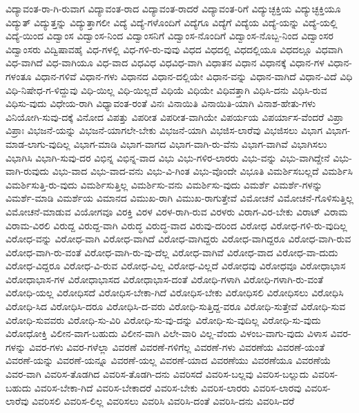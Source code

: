 {ವಿದ್ಯಾವಂತ-ರಾ-ಗಿ-ರುವಾಗ
ವಿದ್ಯಾವಂತ-ರಾದ
ವಿದ್ಯಾವಂತ-ರಾದರೆ
ವಿದ್ಯಾವಂತ-ರಿಗೆ
ವಿದ್ಯುಚ್ಛಕ್ತಿಯ
ವಿದ್ಯುಚ್ಛಕ್ತಿಯೂ
ವಿದ್ಯುತ್
ವಿದ್ಯುತ್ತನ್ನು
ವಿದ್ಯುತ್ತಾಗಲೀ
ವಿದ್ಯೆ
ವಿದ್ಯೆ-ಗಳೊಂದಿಗೆ
ವಿದ್ಯೆಗೂ
ವಿದ್ಯೆಗೆ
ವಿದ್ಯೆಯ
ವಿದ್ಯೆ-ಯನ್ನು
ವಿದ್ಯೆ-ಯಲ್ಲಿ
ವಿದ್ಯೆ-ಯಿಂದ
ವಿದ್ವಾಂಸ
ವಿದ್ವಾಂಸ-ನಿಂದ
ವಿದ್ವಾಂಸನಿಗೆ
ವಿದ್ವಾಂಸ-ನೊಂದಿಗೆ
ವಿದ್ವಾಂಸ-ನೊಬ್ಬ-ನಿಂದ
ವಿದ್ವಾಂಸರ
ವಿದ್ವಾಂಸರು
ವಿದ್ವಿಷಾವಹೈ
ವಿಧ-ಗಳಲ್ಲಿ
ವಿಧ-ಗಳಿ-ರು-ವುವು
ವಿಧದ
ವಿಧದಲ್ಲಿ
ವಿಧದಲ್ಲಿಯೂ
ವಿಧದಲ್ಲೂ
ವಿಧವಾಗಿ
ವಿಧ-ವಾಗಿದೆ
ವಿಧ-ವಾಗಿಯೂ
ವಿಧ-ವಾದ
ವಿಧವಿಧ
ವಿಧವಿಧ-ವಾಗಿ
ವಿಧಾತನ
ವಿಧಾನ
ವಿಧಾನಕ್ಕೆ
ವಿಧಾನ-ಗಳ
ವಿಧಾನ-ಗಳಂತೂ
ವಿಧಾನ-ಗಳಿವೆ
ವಿಧಾನ-ಗಳು
ವಿಧಾನದ
ವಿಧಾನ-ದಲ್ಲಿಯೇ
ವಿಧಾನ-ವನ್ನು
ವಿಧಾನ-ವಾಗಿದೆ
ವಿಧಾನ-ವಿದೆ
ವಿಧಿ
ವಿಧಿ-ನಿಷೇಧ-ಗ-ಳಿದ್ದುವು
ವಿಧಿ-ಯಿಲ್ಲ
ವಿಧಿ-ಯಿಲ್ಲದೆ
ವಿಧಿಯೆ
ವಿಧಿಯೇ
ವಿಧಿವತ್ತಾಗಿ
ವಿಧಿಸಿ-ದನು
ವಿಧಿಸಿ-ರುವ
ವಿಧಿಸು-ವುದು
ವಿಧೇಯ-ರಾಗಿ
ವಿಧ್ಯಾವಂತ-ರಂತೆ
ವಿನಃ
ವಿನಾಯಿತಿ
ವಿನಾಯಿತಿ-ಯಾಗಿ
ವಿನಾಶ-ಹೇತು-ಗಳು
ವಿನಿಯೋಗಿ-ಸುವು-ದಕ್ಕೆ
ವಿನೋದ
ವಿಪತ್ತು
ವಿಪರೀತ
ವಿಪರೀತ-ವಾಗಿಯೇ
ವಿಪರ್ಯಯ
ವಿಪರ್ಯಾಸ-ವೆಂದರೆ
ವಿಪ್ರಾ
ವಿಪ್ರಾಃ
ವಿಭಜನೆ-ಯನ್ನು
ವಿಭಜನೆ-ಯಾಗಲೇ-ಬೇಕು
ವಿಭಜನೆ-ಯಾಗಿ
ವಿಭಜಿಸ-ಲಾರೆವು
ವಿಭಜಿಸಲು
ವಿಭಾಗ
ವಿಭಾಗ-ಮಾಡ-ಲಾಗು-ವುದಿಲ್ಲ
ವಿಭಾಗ-ಮಾಡಿ
ವಿಭಾಗ-ವಾಗದ
ವಿಭಾಗ-ವಾಗಿ-ರು-ವೆನು
ವಿಭಾಗ-ವಾಗಿವೆ
ವಿಭಾಗಿಸಲು
ವಿಭಾಗಿಸಿ
ವಿಭಾಗಿ-ಸುವು-ದರ
ವಿಭಿನ್ನ
ವಿಭಿನ್ನ-ವಾದ
ವಿಭು
ವಿಭು-ಗಳಿರ-ಲಾರರು
ವಿಭು-ವನ್ನು
ವಿಭು-ವಾಗಿದ್ದೇನೆ
ವಿಭು-ವಾಗಿ-ರುವುದು
ವಿಭು-ವಾದ
ವಿಭು-ವಾದ-ವನು
ವಿಭು-ವಿ-ಗಿಂತ
ವಿಭು-ವೊಂದೇ
ವಿಭೂತಿ
ವಿಮರ್ಶಿಸಬಲ್ಲದೆ
ವಿಮರ್ಶಿಸಿ
ವಿಮರ್ಶಿಸುತ್ತಿ-ರು-ವುದು
ವಿಮರ್ಶಿಸುತ್ತಿಲ್ಲ
ವಿಮರ್ಶಿಸು-ವನು
ವಿಮರ್ಶಿಸು-ವುದು
ವಿಮರ್ಶೆ
ವಿಮರ್ಶೆ-ಗಳನ್ನು
ವಿಮರ್ಶೆ-ಮಾಡಿ
ವಿಮರ್ಶೆಯ
ವಿಮಾನದ
ವಿಮುಖ-ರಾಗಿ
ವಿಮುಖ-ರಾಗುತ್ತೇವೆ
ವಿಮೋಚನೆ
ವಿಮೋಚನೆ-ಗೊಳಿಸುತ್ತಿಲ್ಲ
ವಿಮೋಚನೆ-ಮಾಡುವ
ವಿಯೋಗವೂ
ವಿರಕ್ತಿ
ವಿರಳ
ವಿರಳ-ರಾಗಿ-ರುವ
ವಿರಳರು
ವಿರಾಗ-ವಿರ-ಬೇಕು
ವಿರಾಟ್
ವಿರಾಮ
ವಿರಾಮ-ವಿರಲಿ
ವಿರುದ್ದ
ವಿರುದ್ದ-ವಾಗಿ
ವಿರುದ್ಧ
ವಿರುದ್ಧ-ವಾದ
ವಿರುವು-ದರಿಂದ
ವಿರೋಧ
ವಿರೋಧ-ಗಳಿ-ರು-ವುದಿಲ್ಲ
ವಿರೋಧ-ವನ್ನು
ವಿರೋಧ-ವಾಗಿ
ವಿರೋಧ-ವಾಗಿದೆ
ವಿರೋಧ-ವಾಗಿದ್ದರು
ವಿರೋಧ-ವಾಗಿದ್ದರೂ
ವಿರೋಧ-ವಾಗಿ-ರುವ
ವಿರೋಧ-ವಾಗಿ-ರು-ವಂತೆ
ವಿರೋಧ-ವಾಗಿ-ರು-ವು-ದೆಲ್ಲ
ವಿರೋಧ-ವಾಗಿವೆ
ವಿರೋಧ-ವಾದ
ವಿರೋಧ-ವಾ-ದುದು
ವಿರೋಧ-ವಿದ್ದರೂ
ವಿರೋಧ-ವಿ-ರುವ
ವಿರೋಧ-ವಿಲ್ಲ
ವಿರೋಧ-ವಿಲ್ಲದೆ
ವಿರೋಧವು
ವಿರೋಧವೂ
ವಿರೋಧಾಭಾಸ
ವಿರೋಧಾಭಾಸ-ಗಳ
ವಿರೋಧಾಭಾಸದ
ವಿರೋಧಾಭಾಸ-ದಂತೆ
ವಿರೋಧಿ-ಗಳಾಗಿ
ವಿರೋಧಿ-ಗಳಾಗಿ-ರು-ವಂತೆ
ವಿರೋಧಿ-ಯಲ್ಲ
ವಿರೋಧಿಸದೆ
ವಿರೋಧಿಸ-ಬೇಕಾ-ಗಿದೆ
ವಿರೋಧಿಸ-ಬೇಕು
ವಿರೋಧಿಸಲಿ
ವಿರೋಧಿಸಲು
ವಿರೋಧಿಸಿ
ವಿರೋಧಿ-ಸಿದ
ವಿರೋಧಿಸಿ-ದರೂ
ವಿರೋಧಿಸಿ-ದ-ವರು
ವಿರೋಧಿ-ಸುತ್ತಿದ್ದ-ವರೂ
ವಿರೋಧಿ-ಸುತ್ತೇವೆ
ವಿರೋಧಿ-ಸುವ
ವಿರೋಧಿ-ಸುವವರು
ವಿರೋಧಿ-ಸು-ವಿರಿ
ವಿರೋಧಿ-ಸು-ವು-ದನ್ನು
ವಿರೋಧಿ-ಸು-ವುದಿಲ್ಲ
ವಿರೋಧಿ-ಸು-ವುದು
ವಿರೋಧೋಕ್ತಿ
ವಿಲೀನ-ವಾಗ-ಬಹುದು
ವಿಲೀನ-ವಾಗಿ
ವಿಲೇ-ವಾರಿ
ವಿಲ್ಲ-ವೆಂದು
ವಿಳಂಬ-ವಾಗು-ವುದು
ವಿಳಾಸ
ವಿವರ-ಗಳನ್ನು
ವಿವರ-ಗಳು
ವಿವರ-ಗಳೆಲ್ಲಾ
ವಿವರಣೆ
ವಿವರಣೆ-ಗಳಿಗೆಲ್ಲ
ವಿವರಣೆ-ಗಳು
ವಿವರಣೆಯ
ವಿವರಣೆ-ಯಂತೆ
ವಿವರಣೆ-ಯನ್ನು
ವಿವರಣೆ-ಯನ್ನೂ
ವಿವರಣೆ-ಯಲ್ಲ
ವಿವರಣೆ-ಯಾದ
ವಿವರಣೆಯು
ವಿವರಣೆಯೂ
ವಿವರಣೆಯೆ
ವಿವರ-ವಾಗಿ
ವಿವರಿಸ-ತೊಡಗಿದ
ವಿವರಿಸ-ತೊಡಗಿ-ದನು
ವಿವರಿಸದೆ
ವಿವರಿಸ-ಬಲ್ಲವು
ವಿವರಿಸ-ಬಲ್ಲುದು
ವಿವರಿಸ-ಬಹುದು
ವಿವರಿಸ-ಬೇಕಾ-ಗಿದೆ
ವಿವರಿಸ-ಬೇಕಾದರೆ
ವಿವರಿಸ-ಬೇಕು
ವಿವರಿಸ-ಲಾರರು
ವಿವರಿಸ-ಲಾರವು
ವಿವರಿಸ-ಲಾರೆವು
ವಿವರಿಸಲಿ
ವಿವರಿಸ-ಲಿಲ್ಲ
ವಿವರಿಸಲು
ವಿವರಿಸಿ
ವಿವರಿಸಿ-ದಂತೆ
ವಿವರಿಸಿ-ದನು
ವಿವರಿಸಿ-ದರೆ
}
